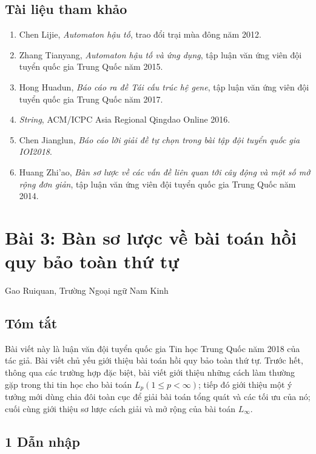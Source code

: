 \documentclass[11pt]{article}
\begin{document}
\subsection*{Tài liệu tham khảo}

\begin{enumerate}
  \item Chen Lijie, \emph{Automaton hậu tố}, trao đổi trại mùa đông năm 2012.
  \item Zhang Tianyang, \emph{Automaton hậu tố và ứng dụng}, tập luận văn ứng
  viên đội tuyển quốc gia Trung Quốc năm 2015.
  \item Hong Huadun, \emph{Báo cáo ra đề Tái cấu trúc hệ gene}, tập luận văn ứng
  viên đội tuyển quốc gia Trung Quốc năm 2017.
  \item \emph{String}, ACM/ICPC Asia Regional Qingdao Online 2016.
  \item Chen Jianglun, \emph{Báo cáo lời giải đề tự chọn trong bài tập đội tuyển
  quốc gia IOI2018}.
  \item Huang Zhi'ao, \emph{Bàn sơ lược về các vấn đề liên quan tới cây động và
  một số mở rộng đơn giản}, tập luận văn ứng viên đội tuyển quốc gia Trung Quốc
  năm 2014.
\end{enumerate}

\section{Bài 3: Bàn sơ lược về bài toán hồi quy bảo toàn thứ tự}

\begin{center}
Gao Ruiquan, Trường Ngoại ngữ Nam Kinh
\end{center}

\subsection*{Tóm tắt}

Bài viết này là luận văn đội tuyển quốc gia Tin học Trung Quốc năm 2018 của tác
giả. Bài viết chủ yếu giới thiệu bài toán hồi quy bảo toàn thứ tự. Trước hết,
thông qua các trường hợp đặc biệt, bài viết giới thiệu những cách làm thường
gặp trong thi tin học cho bài toán \(L_p(1\le p<\infty)\); tiếp đó giới thiệu
một ý tưởng mới dùng chia đôi toàn cục để giải bài toán tổng quát và các tối ưu
của nó; cuối cùng giới thiệu sơ lược cách giải và mở rộng của bài toán
\(L_\infty\).

\subsection*{1 Dẫn nhập}
\end{document}
